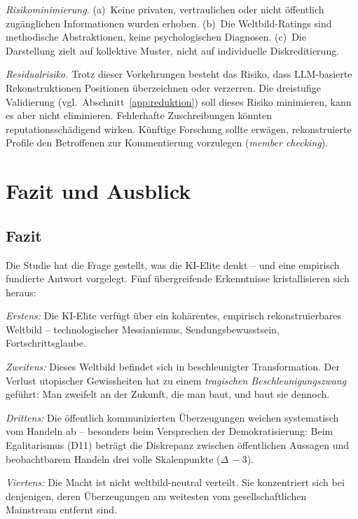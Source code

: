 \documentclass[12pt,a4paper]{article}
\begin{document}
\emph{Risikominimierung.} (a)~Keine privaten, vertraulichen oder nicht \"offentlich zug\"anglichen Informationen wurden erhoben. (b)~Die Weltbild-Ratings sind methodische Abstraktionen, keine psychologischen Diagnosen. (c)~Die Darstellung zielt auf kollektive Muster, nicht auf individuelle Diskreditierung.

\emph{Residualrisiko.} Trotz dieser Vorkehrungen besteht das Risiko, dass LLM-basierte Rekonstruktionen Positionen \"uberzeichnen oder verzerren. Die dreistufige Validierung (vgl.\ Abschnitt~\ref{app:reduktion}) soll dieses Risiko minimieren, kann es aber nicht eliminieren. Fehlerhafte Zuschreibungen k\"onnten reputationssch\"adigend wirken. K\"unftige Forschung sollte erw\"agen, rekonstruierte Profile den Betroffenen zur Kommentierung vorzulegen (\textit{member checking}).


\section{Fazit und Ausblick}
\label{sec:fazit}

\subsection{Fazit}

Die Studie hat die Frage gestellt, was die KI-Elite denkt -- und eine empirisch fundierte Antwort vorgelegt. F\"unf \"ubergreifende Erkenntnisse kristallisieren sich heraus:

\emph{Erstens:} Die KI-Elite verf\"ugt \"uber ein koh\"arentes, empirisch rekonstruierbares Weltbild -- technologischer Messianismus, Sendungsbewusstsein, Fortschrittsglaube.

\emph{Zweitens:} Dieses Weltbild befindet sich in beschleunigter Transformation. Der Verlust utopischer Gewissheiten hat zu einem \emph{tragischen Beschleunigungszwang} gef\"uhrt: Man zweifelt an der Zukunft, die man baut, und baut sie dennoch.

\emph{Drittens:} Die \"offentlich kommunizierten \"Uberzeugungen weichen systematisch vom Handeln ab -- besonders beim Versprechen der Demokratisierung: Beim Egalitarismus (D11) betr\"agt die Diskrepanz zwischen \"offentlichen Aussagen und beobachtbarem Handeln drei volle Skalenpunkte ($\Delta\,-3$).

\emph{Viertens:} Die Macht ist nicht weltbild-neutral verteilt. Sie konzentriert sich bei denjenigen, deren \"Uberzeugungen am weitesten vom gesellschaftlichen Mainstream entfernt sind.
\end{document}
